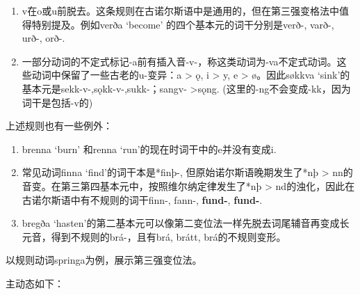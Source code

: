\begin{enumerate}
\def\labelenumi{\arabic{enumi})}
\setcounter{enumi}{3}
\item
  v在o或u前脱去。这条规则在古诺尔斯语中是通用的，但在第三强变格法中值得特别提及。例如verða
  `become‌' 的四个基本元的词干分别是verð-, varð-, urð-, orð-.
\item
  一部分动词的不定式标记-a前有插入音-v-，称这类动词为-va不定式动词。这些动词中保留了一些古老的u-变异：a
  \textgreater{} ǫ, i \textgreater{} y, e \textgreater{} ø。因此søkkva
  `sink‌'的基本元是sekk-v-,sǫkk-v-,sukk-；sangv- \textgreater sǫng.
  (这里的-ng不会变成-kk，因为词干是包括-v的)
\end{enumerate}

上述规则也有一些例外：

\begin{enumerate}
\def\labelenumi{\arabic{enumi})}
\item
  brenna `burn‌' 和renna `run‌'的现在时词干中的e并没有变成i.
\item
  \label{_Ref116921872}{}常见动词finna
  `find‌'的词干本是*finþ-, 但原始诺尔斯语晚期发生了*nþ \textgreater{}
  nn的音变。在第三第四基本元中，按照维尔纳定律发生了*nþ \textgreater{}
  nd的浊化，因此在古诺尔斯语中有不规则的词干finn-, fann-,
  \textbf{fund-}, \textbf{fund-}.
\item
  bregða
  `hasten‌'的第二基本元可以像第二变位法一样先脱去词尾辅音再变成长元音，得到不规则的brá-，且有brá,
  brátt, brá的不规则变形。
\end{enumerate}

以规则动词springa为例，展示第三强变位法。

主动态如下：

